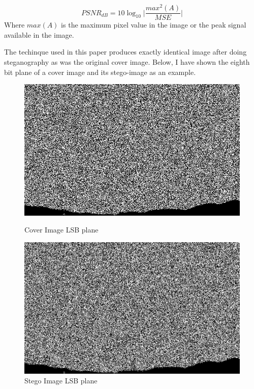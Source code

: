 \documentclass{report}
\begin{document}
\begin{equation}
PSNR_{dB} = 10 \log_{10}\Bigg|\frac{max^{2}(A)}{MSE}\Bigg|
\end{equation}
Where $max(A)$ is the maximum pixel value in the image or the peak signal available in the image. \par The techinque used in this paper produces exactly identical image after doing steganography as was the original cover image. Below, I have shown the eighth bit plane of a cover image and its stego-image as an example.
\begin{figure}[H]
\centering
\begin{minipage}{0.46\linewidth}
\includegraphics[width=\textwidth]{images/konsole.png}
\caption{Cover Image LSB plane}
\end{minipage}
\hfill
\begin{minipage}{0.46\linewidth}
\includegraphics[width=\textwidth]{images/konsole-stego.png}
\caption{Stego Image LSB plane}
\end{minipage}
\end{figure}
\end{document}
